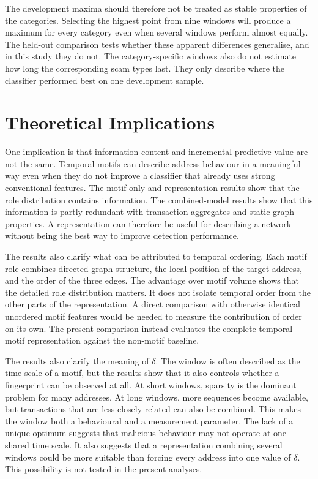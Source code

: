 \documentclass{thesisclass}
\begin{document}
The development maxima should therefore not be treated as stable properties of
the categories. Selecting the highest point from nine windows will produce a
maximum for every category even when several windows perform almost equally.
The held-out comparison tests whether these apparent differences generalise, and
in this study they do not. The category-specific windows also do not estimate how
long the corresponding scam types last. They only describe where the classifier
performed best on one development sample.

\section{Theoretical Implications}

One implication is that information content and incremental predictive value
are not the same. Temporal motifs can describe address behaviour
in a meaningful way even when they do not improve a classifier that already uses
strong conventional features. The motif-only and representation results show
that the role distribution contains information. The combined-model results show
that this information is partly redundant with transaction aggregates and static
graph properties. A representation can therefore be useful for describing a
network without being the best way to improve detection performance.

The results also clarify what can be attributed to temporal ordering. Each motif
role combines directed graph structure, the local position of the target address,
and the order of the three edges. The advantage over motif volume shows that the
detailed role distribution matters. It does not isolate temporal order from the
other parts of the representation. A direct comparison with otherwise identical
unordered motif features would be needed to measure the contribution of order on
its own. The present comparison instead evaluates the complete temporal-motif
representation against the non-motif baseline.

The results also clarify the meaning of $\delta$. The window is often
described as the time scale of a motif, but the results show that it also controls
whether a fingerprint can be observed at all. At short windows, sparsity is the
dominant problem for many addresses. At long windows, more sequences become
available, but transactions that are less closely related can also be combined.
This makes the window both a behavioural and a measurement parameter. The lack
of a unique optimum suggests that malicious behaviour may not operate at one
shared time scale. It also suggests that a representation combining several
windows could be more suitable than forcing every address into one value of
$\delta$. This possibility is not tested in the present analyses.
\end{document}

